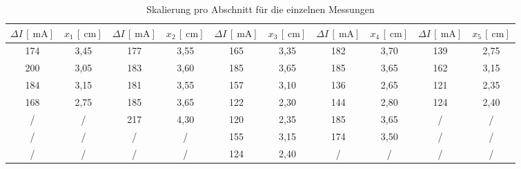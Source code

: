 \begin{table}[H]
  \centering
\begin{tabular}{cccccccccc}

  \toprule
$\Delta{I} \, [\SI{}{\milli\ampere}]$ & $x_1 \, [\SI{}{\centi\meter}]$ &
$\Delta{I} \, [\SI{}{\milli\ampere}]$ & $x_2 \, [\SI{}{\centi\meter}]$ &
$\Delta{I} \, [\SI{}{\milli\ampere}]$ & $x_3 \, [\SI{}{\centi\meter}]$ &
$\Delta{I} \, [\SI{}{\milli\ampere}]$ & $x_4 \, [\SI{}{\centi\meter}]$ &
$\Delta{I} \, [\SI{}{\milli\ampere}]$ & $x_5 \, [\SI{}{\centi\meter}]$ \\

 \midrule
 174  & 3,45  & 177 & 3,55 & 165 & 3,35 & 182 & 3,70 & 139 & 2,75 \\
 200  & 3,05  & 183 & 3,60 & 185 & 3,65 & 185 & 3,65 & 162 & 3,15 \\
 184  & 3,15  & 181 & 3,55 & 157 & 3,10 & 136 & 2,65 & 121 & 2,35 \\
 168  & 2,75  & 185 & 3,65 & 122 & 2,30 & 144 & 2,80 & 124 & 2,40 \\
  /   &   /   & 217 & 4,30 & 120 & 2,35 & 185 & 3,65 &  /  & /    \\
  /   &   /   &   / &   /   & 155 & 3,15 & 174 & 3,50 &  /  & /    \\
  /   &   /   &   / &   /   & 124 & 2,40 & /   &  /   &  /  & /    \\
\bottomrule
\end{tabular}

\caption{Skalierung pro Abschnitt für die einzelnen Messungen}
\label{tab:skalierung}
\end{table}
